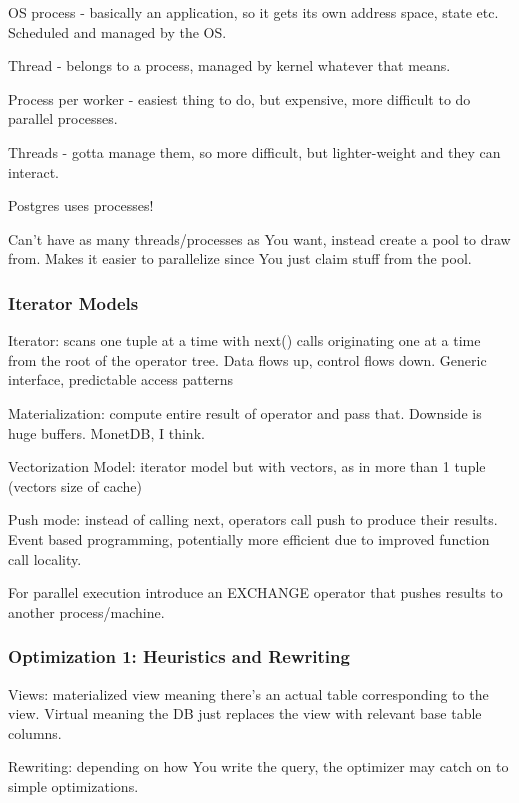 \documentclass{article}
\begin{document}
			OS process - basically an application, so it gets its own address space, state etc. Scheduled and managed by the OS.
			
			Thread - belongs to a process, managed by kernel whatever that means.
			
			Process per worker - easiest thing to do, but expensive, more difficult to do parallel processes.
			
			Threads - gotta manage them, so more difficult, but lighter-weight and they can interact.
			
			Postgres uses processes!
			
			Can't have as many threads/processes as You want, instead create a pool to draw from. Makes it easier to parallelize since You just claim stuff from the pool.
			
		\subsubsection{Iterator Models}
		
			Iterator: scans one tuple at a time with next() calls originating one at a time from the root of the operator tree. Data flows up, control flows down. Generic interface, predictable access patterns
			
			Materialization: compute entire result of operator and pass that. Downside is huge buffers. MonetDB, I think.
			
			Vectorization Model: iterator model but with vectors, as in more than 1 tuple (vectors size of cache)
			
			Push mode: instead of calling next, operators call push to produce their results. Event based programming, potentially more efficient due to improved function call locality.
			
			For parallel execution introduce an EXCHANGE operator that pushes results to another process/machine.
			
		\subsubsection{Optimization 1: Heuristics and Rewriting}
		
			Views: materialized view meaning there's an actual table corresponding to the view. Virtual meaning the DB just replaces the view with relevant base table columns. 
			
			Rewriting: depending on how You write the query, the optimizer may catch on to simple optimizations.
			
\end{document}

